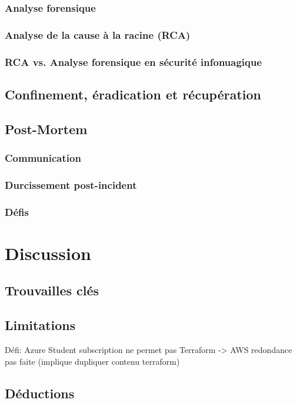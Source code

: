 \documentclass[conference]{IEEEtran}
\begin{document}
\subsubsection{Analyse forensique}
\subsubsection{Analyse de la cause à la racine (RCA)}
\subsubsection{RCA vs. Analyse forensique en sécurité infonuagique}
\subsection{Confinement, éradication et récupération}

\subsection{Post-Mortem}
\subsubsection{Communication}
\subsubsection{Durcissement post-incident}
\subsubsection{Défis}

\section{Discussion}

\subsection{Trouvailles clés}

\subsection{Limitations}
Défi: Azure Student subscription ne permet pas Terraform -> AWS
redondance pas faite (implique dupliquer contenu terraform)
\subsection{Déductions}
\end{document}
